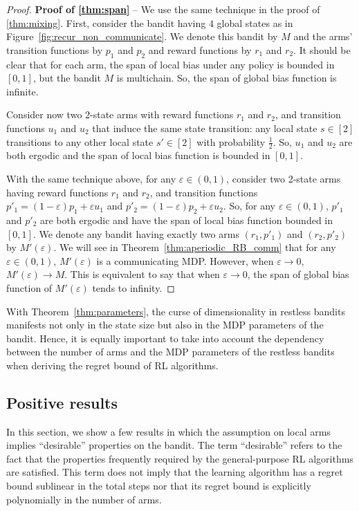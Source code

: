 \begin{proof}
    \textbf{Proof of \ref{thm:span}} -- We use the same technique in the proof of \ref{thm:mixing}.
    First, consider the bandit having $4$ global states as in Figure~\ref{fig:recur_non_communicate}.
    We denote this bandit by $M$ and the arms' transition functions by $p_1$ and $p_2$ and reward functions by $r_1$ and $r_2$.
    It should be clear that for each arm, the span of local bias under any policy is bounded in $[0,1]$, but the bandit $M$ is multichain.
    So, the span of global bias function is infinite.

    Consider now two 2-state arms with reward functions $r_1$ and $r_2$, and transition functions $u_1$ and $u_2$ that induce the same state transition: any local state $s\in[2]$ transitions to any other local state $s'\in[2]$ with probability $\frac12$.
    So, $u_1$ and $u_2$ are both ergodic and the span of local bias function is bounded in $[0,1]$.

    With the same technique above, for any $\varepsilon\in(0,1)$, consider two 2-state arms having reward functions $r_1$ and $r_2$, and transition functions $p'_1=(1-\varepsilon)p_1+\varepsilon u_1$ and $p'_2=(1-\varepsilon)p_2+\varepsilon u_2$.
    So, for any $\varepsilon\in(0,1)$, $p'_1$ and $p'_2$ are both ergodic and have the span of local bias function bounded in $[0,1]$.
    We denote any bandit having exactly two arms $(r_1,p'_1)$ and $(r_2,p'_2)$ by $M'(\varepsilon)$.
    We will see in Theorem~\ref{thm:aperiodic_RB_comm} that for any $\varepsilon\in(0,1)$, $M'(\varepsilon)$ is a communicating MDP.
    However, when $\varepsilon\to0$, $M'(\varepsilon)\to M$.
    This is equivalent to say that when $\varepsilon\to0$, the span of global bias function of $M'(\varepsilon)$ tends to infinity.
\end{proof}

With Theorem~\ref{thm:parameters}, the curse of dimensionality in restless bandits manifests not only in the state size but also in the MDP parameters of the bandit.
Hence, it is equally important to take into account the dependency between the number of arms and the MDP parameters of the restless bandits when deriving the regret bound of RL algorithms.

\subsection{Positive results}

In this section, we show a few results in which the assumption on local arms implies ``desirable'' properties on the bandit.
The term ``desirable'' refers to the fact that the properties frequently required by the general-purpose RL algorithms are satisfied.
This term does not imply that the learning algorithm has a regret bound sublinear in the total steps nor that its regret bound is explicitly polynomially in the number of arms.

